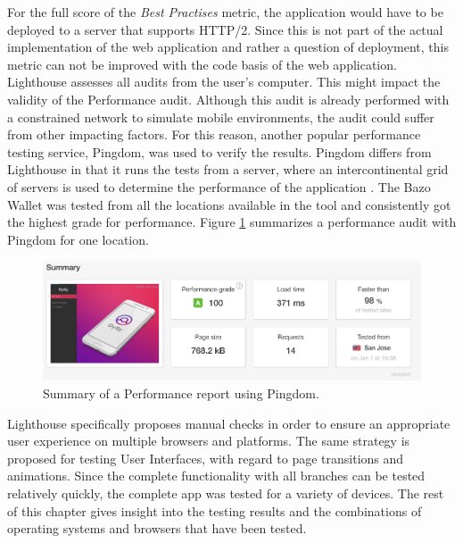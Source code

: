 For the full score of the \textit{Best Practises} metric, the application would have to be deployed to a server that supports HTTP/2. Since this is not part of the actual implementation of the web application and rather a question of deployment, this metric can not be improved with the code basis of the web application.
Lighthouse assesses all audits from the user's computer. This might impact the validity of the Performance audit. Although this audit is already performed with a constrained network to simulate mobile environments, the audit could suffer from other impacting factors. For this reason, another popular performance testing service, Pingdom, was used to verify the results. Pingdom differs from Lighthouse in that it runs the tests from a server, where an intercontinental grid of servers is used to determine the performance of the application \cite{pingdom}. The Bazo Wallet was tested from all the locations available in the tool and consistently got the highest grade for performance. Figure \ref{fig:pingdom} summarizes a performance audit with Pingdom for one location.
\begin{figure}
\centering
\includegraphics[width=1\textwidth]{screenshots/pingdom.png}
\caption{\label{fig:pingdom}Summary of a Performance report using Pingdom.}
\end{figure}

Lighthouse specifically proposes manual checks in order to ensure an appropriate user experience on multiple browsers and platforms. The same strategy is proposed for testing User Interfaces, with regard to page transitions and animations. 
Since the complete functionality with all branches can be tested relatively quickly, the complete app was tested for a variety of devices. The rest of this chapter gives insight into the testing results and the combinations of operating systems and browsers that have been tested.


